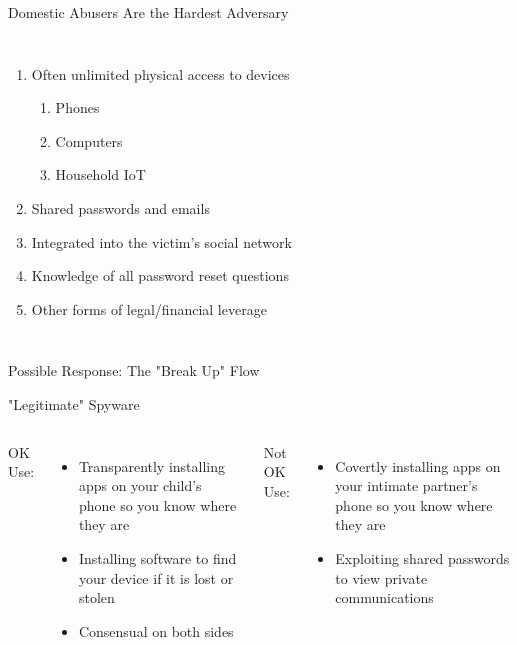 \documentclass[nobackground,dvipsnames,table]{beamer}
\begin{document}
\begin{frame}{Domestic Abusers Are the Hardest Adversary}
    \begin{columns}
            \begin{enumerate}
                \item Often unlimited physical access to devices
                \begin{enumerate}
                    \item Phones
                    \item Computers
                    \item Household IoT
                \end{enumerate}
                \item Shared passwords and emails
                \item Integrated into the victim’s social network
                \item Knowledge of all password reset questions
                \item Other forms of legal/financial leverage
            \end{enumerate}
    \end{columns}
\end{frame}

\begin{frame}{Possible Response: The "Break Up" Flow}
\end{frame}

\begin{frame}{"Legitimate" Spyware}
    \begin{columns}
            OK Use:
            \begin{itemize}
                \item Transparently installing apps on your child’s phone so you know where they are
                \item Installing software to find your device if it is lost or stolen
                \item Consensual on both sides
            \end{itemize}
            Not OK Use:
            \begin{itemize}
                \item Covertly installing apps on your intimate partner’s phone so you know where they are
                \item Exploiting shared passwords to view private communications
            \end{itemize}
    \end{columns}
\end{frame}
\end{document}
